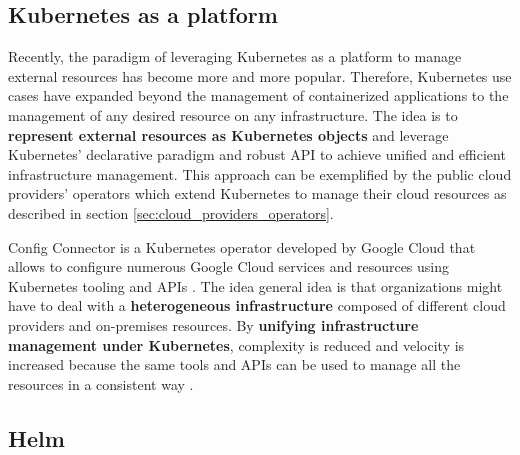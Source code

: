 \subsection{Kubernetes as a platform}

Recently, the paradigm of leveraging Kubernetes as a platform to manage external resources has become more and more popular.
Therefore, Kubernetes use cases have expanded beyond the management of containerized applications to the management of any desired resource on any infrastructure.
The idea is to \textbf{represent external resources as Kubernetes objects} and leverage Kubernetes' declarative paradigm and robust API to achieve unified and efficient infrastructure management.
This approach can be exemplified by the public cloud providers' operators which extend Kubernetes to manage their cloud resources as described in section \ref{sec:cloud_providers_operators}.

Config Connector is a Kubernetes operator developed by Google Cloud that allows to configure numerous Google Cloud services and resources using Kubernetes tooling and APIs \cite{gcp_config_connector}.
The idea general idea is that organizations might have to deal with a \textbf{heterogeneous infrastructure} composed of different cloud providers and on-premises resources. 
By \textbf{unifying infrastructure management under Kubernetes}, complexity is reduced and velocity is increased because the same tools and APIs can be used to manage all the resources in a consistent way \cite{gcp_config_connector}.




\subsection{Helm}

